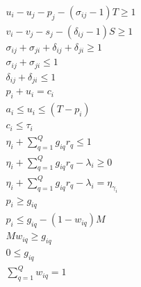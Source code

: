 \documentclass[conference]{IEEEtran}
\begin{document}
\begin{subequations}
\begin{align}
    u_i - u_j - p_j - (\sigma_{ij} - 1)T \geq 1                           \label{subeq:time}         \\
    v_i - v_j - s_j - (\delta_{ij} - 1)S \geq 1                           \label{subeq:space}        \\
    \sigma_{ij} + \sigma_{ji} + \delta_{ij} + \delta_{ji} \geq 1          \label{subeq:valid_pos}    \\
    \sigma_{ij} + \sigma_{ji} \leq 1                                      \label{subeq:sigma}        \\
    \delta_{ij} + \delta_{ji} \leq 1                                      \label{subeq:delta}        \\
    p_i + u_i = c_i                                                       \label{subeq:detach}       \\
    a_i \leq u_i \leq (T - p_i)                                           \label{subeq:valid_starts} \\
    c_i \leq \tau_i                                                       \label{subeq:valid_depart} \\
    \eta_i + \sum_{q=1}^Q g_{iq} r_q \leq 1                        \label{subeq:max_charge}   \\
    \eta_i + \sum_{q=1}^Q g_{iq} r_q - \lambda_i \geq 0            \label{subeq:min_charge}   \\
    \eta_i + \sum_{q=1}^Q g_{iq} r_q - \lambda_i = \eta_{\gamma_i} \label{subeq:next_charge}  \\
    p_i \geq g_{iq}                                                       \label{subeq:gpgret}       \\
    p_i \leq g_{iq} - (1 - w_{iq})M                                       \label{subeq:gpsmol}       \\
    Mw_{iq} \geq g_{iq}                                                   \label{subeq:gwgret}       \\
    0 \leq g_{iq}                                                         \label{subeq:gwsmol}       \\
    \sum_{q=1}^Q w_{iq} = 1                                               \label{subeq:wmax}         \\
\end{align}
\end{subequations}
\end{document}
